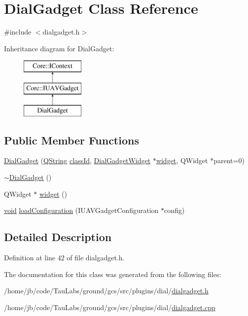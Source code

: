 \hypertarget{class_dial_gadget}{\section{\-Dial\-Gadget \-Class \-Reference}
\label{class_dial_gadget}
}


{\ttfamily \#include $<$dialgadget.\-h$>$}

\-Inheritance diagram for \-Dial\-Gadget\-:\begin{figure}[H]
\begin{center}
\leavevmode
\includegraphics[height=3.000000cm]{class_dial_gadget}
\end{center}
\end{figure}
\subsection*{\-Public \-Member \-Functions}
\begin{DoxyCompactItemize}
\item 
\hyperlink{group___dial_plugin_gaef5c9e1077a9a230622054bcc5337958}{\-Dial\-Gadget} (\hyperlink{group___u_a_v_objects_plugin_gab9d252f49c333c94a72f97ce3105a32d}{\-Q\-String} \hyperlink{group___core_plugin_ga3878fde66a57220608960bcc3fbeef2c}{class\-Id}, \hyperlink{class_dial_gadget_widget}{\-Dial\-Gadget\-Widget} $\ast$\hyperlink{group___dial_plugin_ga1afd77bac7b60ceae978b7e74f9eddee}{widget}, \-Q\-Widget $\ast$parent=0)
\item 
\hyperlink{group___dial_plugin_ga9fc6ec1cdb4ac0de853c9b35950c4d11}{$\sim$\-Dial\-Gadget} ()
\item 
\-Q\-Widget $\ast$ \hyperlink{group___dial_plugin_ga1afd77bac7b60ceae978b7e74f9eddee}{widget} ()
\item 
\hyperlink{group___u_a_v_objects_plugin_ga444cf2ff3f0ecbe028adce838d373f5c}{void} \hyperlink{group___dial_plugin_ga571fd73249a763cfe4850be854e3dbc6}{load\-Configuration} (\-I\-U\-A\-V\-Gadget\-Configuration $\ast$config)
\end{DoxyCompactItemize}


\subsection{\-Detailed \-Description}


\-Definition at line 42 of file dialgadget.\-h.



\-The documentation for this class was generated from the following files\-:\begin{DoxyCompactItemize}
\item 
/home/jb/code/\-Tau\-Labs/ground/gcs/src/plugins/dial/\hyperlink{dialgadget_8h}{dialgadget.\-h}\item 
/home/jb/code/\-Tau\-Labs/ground/gcs/src/plugins/dial/\hyperlink{dialgadget_8cpp}{dialgadget.\-cpp}\end{DoxyCompactItemize}
